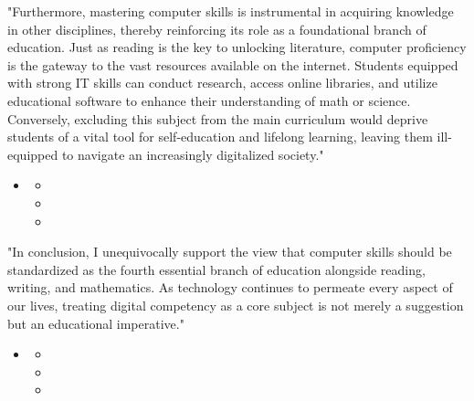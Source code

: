 \documentclass{../templateWriting/cdwriting}
\begin{document}

"Furthermore, mastering computer skills is instrumental in acquiring knowledge in other disciplines, thereby reinforcing its role as a foundational branch of education. Just as reading is the key to unlocking literature, computer proficiency is the gateway to the vast resources available on the internet. Students equipped with strong IT skills can conduct research, access online libraries, and utilize educational software to enhance their understanding of math or science. Conversely, excluding this subject from the main curriculum would deprive students of a vital tool for self-education and lifelong learning, leaving them ill-equipped to navigate an increasingly digitalized society."
\begin{itemize}
\item {}
\begin{itemize}
\item {}
\item {}
\item {}
\end{itemize}
\end{itemize}


"In conclusion, I unequivocally support the view that computer skills should be standardized as the fourth essential branch of education alongside reading, writing, and mathematics. As technology continues to permeate every aspect of our lives, treating digital competency as a core subject is not merely a suggestion but an educational imperative."
\begin{itemize}
\item {}
\begin{itemize}
\item {}
\item {}
\item {}
\end{itemize}
\end{itemize}
\end{document}
